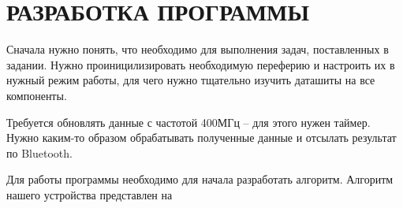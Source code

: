 \begin{sloppypar} %
\newpage %
\section{РАЗРАБОТКА ПРОГРАММЫ} %

Сначала нужно понять, что необходимо для выполнения задач, поставленных в задании. Нужно проиницилизировать необходимую переферию и настроить их в нужный режим работы, для чего нужно тщательно изучить даташиты на все компоненты.

Требуется обновлять данные с частотой 400МГц --  для этого нужен таймер. Нужно каким-то образом обрабатывать полученные данные и отсылать результат по Bluetooth. 

Для работы программы необходимо для начала разработать алгоритм. Алгоритм нашего устройства представлен на 






\end{sloppypar}
